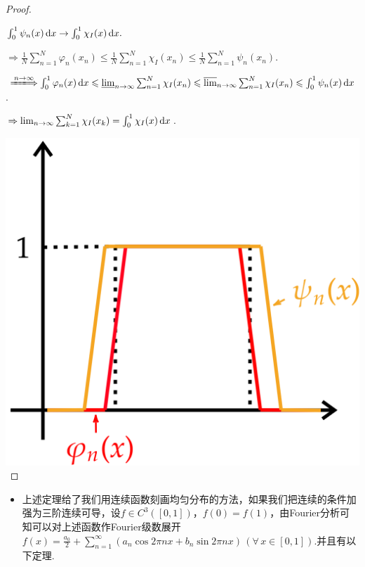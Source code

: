 \begin{proof}
\begin{minipage}[t]{0.8\textwidth}
\begin{itemize}
\begin{enumerate}[(1)]
            $\int_0^1{\psi_n(x)}\mathop{}\!\mathrm{d} x \to \int_0^1{\chi_{I}(x)}\mathop{}\!\mathrm{d} x.$\par
        \end{enumerate}
        $\Rightarrow \frac{1}{N}\sum_{n=1}^N{\varphi_n(x_n)} \leq \frac{1}{N}\sum_{n=1}^N{\chi_{I}(x_n)} \leq \frac{1}{N}\sum_{n=1}^N{\psi_n(x_n)}$.\par
        $\xLongrightarrow{n\to\infty}\int_0^1{\varphi_n(x)}\d x \leq \varliminf_{n\to\infty}{\sum_{n=1}^N{\chi_{I}(x_n)}} \leq \varlimsup_{n\to\infty}{\sum_{n=1}^N{\chi_{I}(x_n)}} \leq \int_0^1{\psi_n(x)}\d x$.\par
        $\Rightarrow \lim_{n\to\infty}{\sum_{k=1}^N{\chi_{I}(x_k)}} = \int_0^1{\chi_{I}(x)}\mathop{}\!\mathrm{d} x$.\par
    \end{itemize}
    \end{minipage}
    \begin{minipage}[t]{0.225\textwidth}
        \vspace{0 em}
        \includegraphics[width=1\textwidth]{fig/2.1.png}
    \end{minipage}\par
\end{proof}\par

\begin{itemize}
    \item 上述定理给了我们用连续函数刻画均匀分布的方法，如果我们把连续的条件加强为三阶连续可导，设$f \in C^3([0,1])$，$f(0)=f(1)$，由Fourier分析可知可以对上述函数作Fourier级数展开$f(x)=\frac{a_0}{2}+\sum_{n=1}^\infty(a_n\cos{2\pi nx}+b_n\sin{2\pi nx})\, (\forall\, x\in[0,1])$.并且有以下定理.
\end{itemize}

